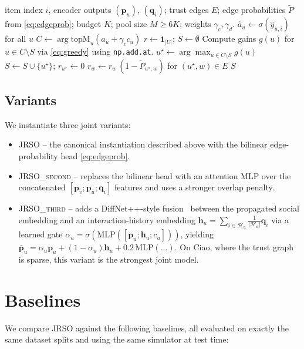 \documentclass[conference]{IEEEtran}
\begin{document}
\begin{algorithm}[t]
\caption{Vectorised CELF-style greedy seed selection.}
\label{alg:greedy}
\begin{algorithmic}[1]
\Require item index $i$, encoder outputs
$(\mathbf{p}_u)$, $(\mathbf{q}_i)$; trust edges $E$;
edge probabilities $\widetilde P$ from \eqref{eq:edgeprob};
budget $K$; pool size $M\!\ge\!6K$;
weights $\gamma_c,\gamma_d$.
\State $\hat a_u\leftarrow\sigma(\hat y_{u,i})$ for all $u$
\State $C\leftarrow\arg\mathrm{topM}_u(\hat a_u+\gamma_c c_u)$ 
\State $r\leftarrow\mathbf{1}_{|U|}$;\; $S\leftarrow\emptyset$
  \State Compute gains $g(u)$ for $u\in C\setminus S$ via
  \eqref{eq:greedy} using \texttt{np.add.at}.
  \State $u^\star\leftarrow\arg\max_{u\in C\setminus S} g(u)$
  \State $S\leftarrow S\cup\{u^\star\}$;\; $r_{u^\star}\leftarrow 0$
  \State $r_w\leftarrow r_w\,(1-\widetilde P_{u^\star,w})$ for $(u^\star,w)\!\in\!E$
\EndWhile
\State \Return $S$
\end{algorithmic}
\end{algorithm}

\subsection{Variants}
We instantiate three joint variants:
\begin{itemize}
    \item \textsc{JRSO} -- the canonical instantiation described above
    with the bilinear edge-probability head \eqref{eq:edgeprob}.
    \item \textsc{JRSO\_second} -- replaces the bilinear head with an
    attention MLP over the concatenated $[\mathbf{p}_v;\mathbf{p}_u;\mathbf{q}_i]$
    features and uses a stronger overlap penalty.
    \item \textsc{JRSO\_third} -- adds a DiffNet++-style
    fusion~\cite{wu2020diffnet++} between the propagated social
    embedding and an interaction-history embedding
    $\mathbf{h}_u=\sum_{i\in\mathcal{H}_u}\!\frac{1}{|\mathcal{H}_u|}\mathbf{q}_i$
    via a learned gate $\alpha_u=\sigma(\mathrm{MLP}([\mathbf{p}_u;\mathbf{h}_u;c_u]))$,
    yielding $\bar{\mathbf{p}}_u=\alpha_u\mathbf{p}_u+(1-\alpha_u)\mathbf{h}_u+0.2\,\mathrm{MLP}(\dots)$.
    On Ciao, where the trust graph is sparse, this variant is the
    strongest joint model.
\end{itemize}

\section{Baselines}
We compare JRSO against the following baselines, all evaluated on
exactly the same dataset splits and using the same simulator at test
time:
\end{document}
